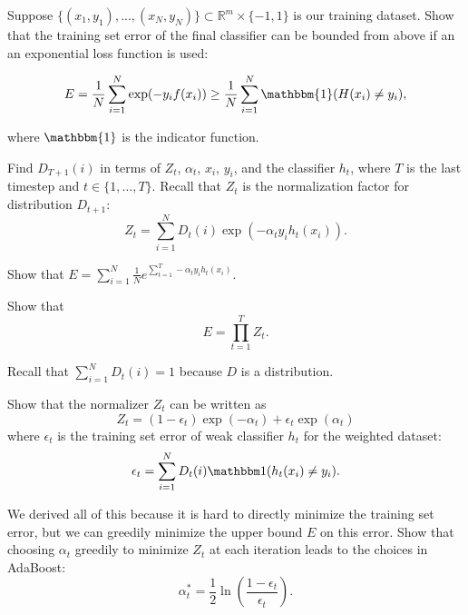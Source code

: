 Suppose $\{(x_1, y_1), ..., (x_N, y_N)\} \subset \mathbb{R}^m \times \{-1,1\}$ is our training dataset.  Show that the training set error of the final classifier can be bounded from
above if an an exponential loss function is used:

$$E = \frac{1}{N} \sum\limits_{i=1}^N \exp(-y_{i}f(x_i)) \geq \frac{1}{N} \sum\limits_{i=1}^N \mathbbm{1}(H(x_i) \neq y_i),$$

where $\mathbbm{1}$ is the indicator function.


\problem[3 EC]
Find $D_{T + 1}(i)$ in terms of $Z_t$, $\alpha_t$, $x_i$, $y_i$, and the classifier $h_t$, where $T$ is the last timestep and $t \in \{1, \ldots, T\}$. Recall that $Z_t$ is the normalization factor for distribution $D_{t+1}$:
$$Z_t = \sum\limits_{i=1}^N D_t(i) \exp(-\alpha_{t}y_{i}h_{t}(x_{i})).$$

\problem[2 EC]
Show that $E = \sum_{i=1}^N  \frac{1}{N} e^{\sum_{t=1}^T -\alpha_t y_i h_t(x_i)}.$


\problem[5 EC]
Show that
$$E = \prod\limits_{t=1}^T Z_t.$$

\begin{hint}
	Recall that $\sum_{i = 1}^N D_t(i) = 1$ because $D$ is a distribution.
\end{hint}

\problem[5 EC]
Show that the normalizer $Z_t$ can be written as
\[Z_t = (1 - \epsilon_t) \exp(-\alpha_t) + \epsilon_{t} \exp(\alpha_t)\]
where $\epsilon_t$ is the training set error of weak classifier $h_t$ for the weighted dataset:
\[\epsilon_t = \sum\limits_{i=1}^N D_t(i)\mathbbm1(h_t(x_i) \neq y_i).\]


\problem[2 EC]
We derived all of this because it is hard to directly minimize the training set error, but we can greedily minimize the upper bound $E$ on this error. Show that choosing $\alpha_t$
greedily to minimize $Z_t$ at each iteration leads to the choices in
AdaBoost:
$$\alpha_{t}^* = \frac{1}{2} \ln \left(\frac{1 - \epsilon_t}{\epsilon_t} \right).$$


